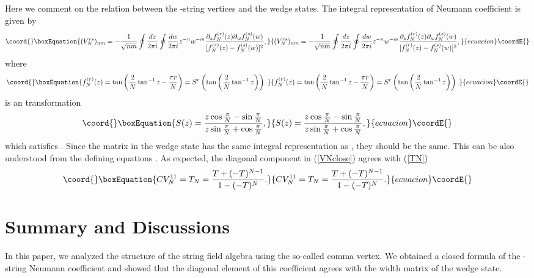 \documentclass[a4paper,12pt]{article}
\def\R{{\bf R}}
\def\o{\over}
\def\del{\partial}
\def\bra{\langle}
\def\ket{\rangle}
\def\lf{\left}
\def\ri{\right}
\def\rt#1{\sqrt{#1}}
\def\st{\star}
\begin{document}
Here we comment on the relation between the \coordHE{}-string 
vertices and the wedge states.
The integral representation of Neumann coefficient is given by
\begin{equation}\coord{}\boxEquation{
(V_N^{rs})_{nm}=-{1\o\rt{nm}}\oint {dz\o2\pi i}\oint {dw\o 2\pi i}
z^{-n}w^{-m}{\del_z f^{(r)}_N(z)\del_wf^{(s)}_N(w)
\o [f^{(r)}_N(z)-f^{(s)}_N(w)]^2}, 
}{
(V_N^{rs})_{nm}=-{1\o\rt{nm}}\oint {dz\o2\pi i}\oint {dw\o 2\pi i}
z^{-n}w^{-m}{\del_z f^{(r)}_N(z)\del_wf^{(s)}_N(w)
\o [f^{(r)}_N(z)-f^{(s)}_N(w)]^2}, 
}{ecuacion}\coordE{}\end{equation}
where
\begin{equation}\coord{}\boxEquation{
f^{(r)}_N(z)=\tan\lf({2\o N}\tan^{-1}z-{\pi r\o N}\ri)
=S^r\lf(\tan\lf({2\o N}\tan^{-1}z\ri)\ri). 
}{
f^{(r)}_N(z)=\tan\lf({2\o N}\tan^{-1}z-{\pi r\o N}\ri)
=S^r\lf(\tan\lf({2\o N}\tan^{-1}z\ri)\ri). 
}{ecuacion}\coordE{}\end{equation}
\coordHE{} is an \myHighlight{$SL(2,\R)$}\coordHE{} transformation
\begin{equation}\coord{}\boxEquation{
S(z)={z\cos{\pi\o N}-\sin{\pi\o N}\o z\sin{\pi\o N}+\cos{\pi\o N}},
}{
S(z)={z\cos{\pi\o N}-\sin{\pi\o N}\o z\sin{\pi\o N}+\cos{\pi\o N}},
}{ecuacion}\coordE{}\end{equation}
which satisfies \coordHE{}. Since the matrix \coordHE{} in the wedge state \myHighlight{$|N\ket_w$}\coordHE{}
has the same integral representation as \coordHE{}, they should be the same.
This can be also understood from the defining equations
\myHighlight{$|N\ket_w = \Big(|0\ket\Big)_{\st}^{N-1}
={}_1\bra 0| \cdots {}_{N-1}\bra 0| |V_N\ket$}\coordHE{}.
As expected, the diagonal component in (\ref{VNclose}) agrees with  (\ref{TN})
\begin{equation}\coord{}\boxEquation{
CV_N^{11}=T_N={T+(-T)^{N-1}\o 1-(-T)^N}.
}{
CV_N^{11}=T_N={T+(-T)^{N-1}\o 1-(-T)^N}.
}{ecuacion}\coordE{}\end{equation}



\section{Summary and Discussions}
In this paper, we analyzed the structure of the string field algebra
using the so-called comma vertex. We obtained a closed formula of the
\coordHE{}-string Neumann coefficient and showed that the diagonal element of
this coefficient agrees with the width matrix of
the wedge state.
\end{document}
